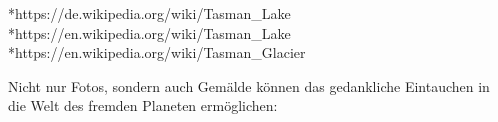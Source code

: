 *https://de.wikipedia.org/wiki/Tasman_Lake
*https://en.wikipedia.org/wiki/Tasman_Lake
*https://en.wikipedia.org/wiki/Tasman_Glacier

\cleardoubleoddpage

%

\cleardoubleoddpage

%

\cleardoubleoddpage

%

\cleardoubleoddpage

%

\cleardoubleoddpage

%

\cleardoubleoddpage

%

\cleardoubleoddpage

%

\cleardoubleoddpage

%

\cleardoubleoddpage

%

\cleardoubleoddpage

%

\cleardoubleoddpage

%

\cleardoubleoddpage

%

\cleardoubleoddpage

Nicht nur Fotos, sondern auch Gemälde können das gedankliche Eintauchen in die Welt des fremden Planeten ermöglichen:

\cleardoubleoddpage

%

\cleardoubleoddpage

%

